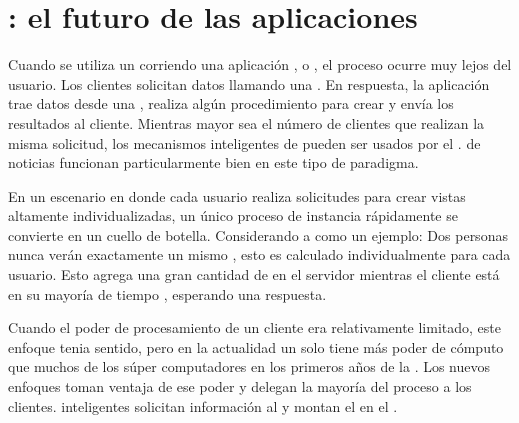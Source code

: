 
\section{\isomorphicAS \javaScriptNAME : el futuro de las aplicaciones \webINT}\label{cap:justificacion:section:web_app}

Cuando se utiliza un \backendAS corriendo una aplicación \javaNAME, \phpNAME o \railsNAME, el proceso ocurre muy lejos del usuario. Los clientes solicitan datos llamando una \uriNAME. En respuesta, la aplicación trae datos desde una \dataBaseDB, realiza algún procedimiento para crear \htmlNAME y envía los resultados al cliente. Mientras mayor sea el número de clientes que realizan la misma solicitud, los mecanismos inteligentes de \caching pueden ser usados por el \serverAS. \sitesINT de noticias funcionan particularmente bien en este tipo de paradigma.

En un escenario en donde cada usuario realiza solicitudes para crear vistas altamente individualizadas, un único proceso de instancia rápidamente se convierte en un cuello de botella. Considerando a \facebook como un ejemplo: Dos personas nunca verán exactamente un mismo \facebookwall, esto es calculado individualmente para cada usuario. Esto agrega una gran cantidad de \stress en el servidor mientras el cliente está en su mayoría de tiempo \idle, esperando una respuesta.

Cuando el poder de procesamiento de un cliente era relativamente limitado, este enfoque tenia sentido, pero en la actualidad un solo \smartphoneCPT tiene más poder de cómputo que muchos de los súper computadores en los primeros años de la \webINT. Los nuevos enfoques toman ventaja de ese poder y delegan la mayoría del proceso a los clientes. \frontEndsAS inteligentes solicitan información al \serverAS y montan el \htmldomNAME en el \browserINT.

